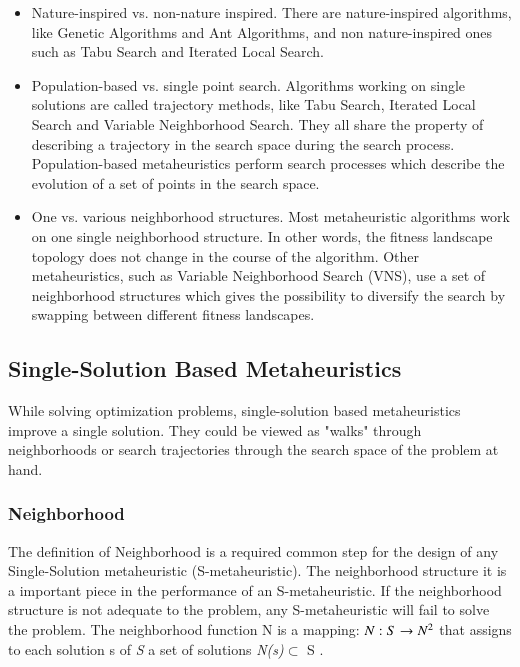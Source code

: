 \begin{itemize}
\item Nature-inspired vs. non-nature inspired. There are nature-inspired algorithms, like Genetic Algorithms and Ant Algorithms, and non nature-inspired ones such as Tabu Search and Iterated Local Search. 

\item Population-based vs. single point search. Algorithms working on single solutions are called trajectory methods, like Tabu Search, Iterated Local Search and Variable Neighborhood Search. They all share the property of describing a trajectory in the search space during the search process. Population-based metaheuristics perform search processes which describe the evolution of a set of points in the search space.

\item One vs. various neighborhood structures. Most metaheuristic algorithms work on one single neighborhood structure. In other words, the fitness landscape topology does not change in the course of the algorithm. Other metaheuristics, such as Variable Neighborhood Search (VNS), use a set of neighborhood structures which gives the possibility to diversify the search by swapping between different fitness
landscapes.
\end{itemize}

\subsection{Single-Solution Based Metaheuristics}

While solving optimization problems, single-solution based metaheuristics improve a single solution. They could be viewed as "walks" through neighborhoods or search trajectories through the search space of the problem at hand.
 

\subsubsection{Neighborhood}

The definition of Neighborhood is a required common step for the design of any Single-Solution metaheuristic (S-metaheuristic). The neighborhood structure it is a important piece in the performance of an S-metaheuristic. If the neighborhood structure is not adequate to the problem,
any S-metaheuristic will fail to solve the problem. The neighborhood function N is a mapping: $ N : S \rightarrow N\textsuperscript{2} $ that assigns to each solution s of \textit{S} a set of solutions \textit{N(s)}$\subset$ S \cite{Talbi2013}.

